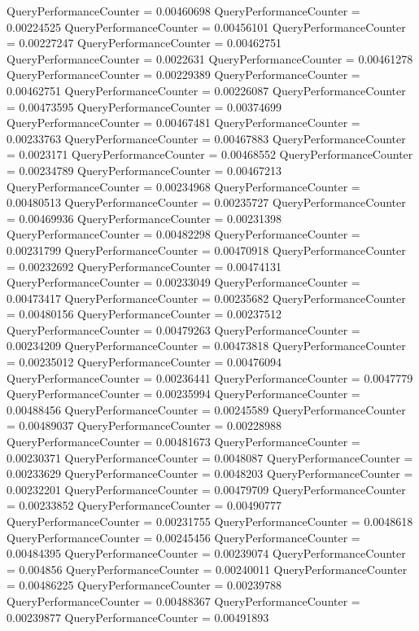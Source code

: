 \documentclass[9pt]{article}
\theoremstyle{plain}
\theoremstyle{definition}
\theoremstyle{remark}
\numberwithin{equation}{section}
\begin{document}
QueryPerformanceCounter  =  0.00460698
QueryPerformanceCounter  =  0.00224525
QueryPerformanceCounter  =  0.00456101
QueryPerformanceCounter  =  0.00227247
QueryPerformanceCounter  =  0.00462751
QueryPerformanceCounter  =  0.0022631
QueryPerformanceCounter  =  0.00461278
QueryPerformanceCounter  =  0.00229389
QueryPerformanceCounter  =  0.00462751
QueryPerformanceCounter  =  0.00226087
QueryPerformanceCounter  =  0.00473595
QueryPerformanceCounter  =  0.00374699
QueryPerformanceCounter  =  0.00467481
QueryPerformanceCounter  =  0.00233763
QueryPerformanceCounter  =  0.00467883
QueryPerformanceCounter  =  0.0023171
QueryPerformanceCounter  =  0.00468552
QueryPerformanceCounter  =  0.00234789
QueryPerformanceCounter  =  0.00467213
QueryPerformanceCounter  =  0.00234968
QueryPerformanceCounter  =  0.00480513
QueryPerformanceCounter  =  0.00235727
QueryPerformanceCounter  =  0.00469936
QueryPerformanceCounter  =  0.00231398
QueryPerformanceCounter  =  0.00482298
QueryPerformanceCounter  =  0.00231799
QueryPerformanceCounter  =  0.00470918
QueryPerformanceCounter  =  0.00232692
QueryPerformanceCounter  =  0.00474131
QueryPerformanceCounter  =  0.00233049
QueryPerformanceCounter  =  0.00473417
QueryPerformanceCounter  =  0.00235682
QueryPerformanceCounter  =  0.00480156
QueryPerformanceCounter  =  0.00237512
QueryPerformanceCounter  =  0.00479263
QueryPerformanceCounter  =  0.00234209
QueryPerformanceCounter  =  0.00473818
QueryPerformanceCounter  =  0.00235012
QueryPerformanceCounter  =  0.00476094
QueryPerformanceCounter  =  0.00236441
QueryPerformanceCounter  =  0.0047779
QueryPerformanceCounter  =  0.00235994
QueryPerformanceCounter  =  0.00488456
QueryPerformanceCounter  =  0.00245589
QueryPerformanceCounter  =  0.00489037
QueryPerformanceCounter  =  0.00228988
QueryPerformanceCounter  =  0.00481673
QueryPerformanceCounter  =  0.00230371
QueryPerformanceCounter  =  0.0048087
QueryPerformanceCounter  =  0.00233629
QueryPerformanceCounter  =  0.0048203
QueryPerformanceCounter  =  0.00232201
QueryPerformanceCounter  =  0.00479709
QueryPerformanceCounter  =  0.00233852
QueryPerformanceCounter  =  0.00490777
QueryPerformanceCounter  =  0.00231755
QueryPerformanceCounter  =  0.0048618
QueryPerformanceCounter  =  0.00245456
QueryPerformanceCounter  =  0.00484395
QueryPerformanceCounter  =  0.00239074
QueryPerformanceCounter  =  0.004856
QueryPerformanceCounter  =  0.00240011
QueryPerformanceCounter  =  0.00486225
QueryPerformanceCounter  =  0.00239788
QueryPerformanceCounter  =  0.00488367
QueryPerformanceCounter  =  0.00239877
QueryPerformanceCounter  =  0.00491893
\end{document}
